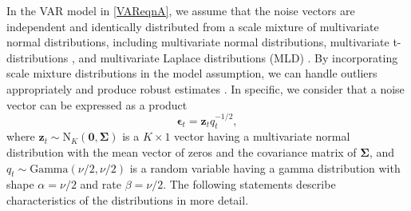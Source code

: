 \documentclass[
]{jss}
\begin{document}
In the VAR model in \eqref{VAReqnA}, we assume that the noise vectors
are independent and identically distributed from a scale mixture of
multivariate normal distributions, including multivariate normal
distributions, multivariate t-distributions \citep{Ni05}, and
multivariate Laplace distributions (MLD) \citep{Eltoft06}. By
incorporating scale mixture distributions in the model assumption, we
can handle outliers appropriately and produce robust estimates
\citep{West84}. In specific, we consider that a noise vector can be
expressed as a product \begin{equation}
    \label{productZD}
    \boldsymbol\epsilon_t = \mathbf{z}_t q_t^{-1/2},
    \end{equation} where
\(\mathbf{z}_t \sim \text{N}_K(\mathbf{0}, \mathbf{\Sigma})\) is a
\(K\times 1\) vector having a multivariate normal distribution with the
mean vector of zeros and the covariance matrix of \(\boldsymbol\Sigma\),
and \(q_t \sim \text{Gamma}(\nu/2, \nu/2)\) is a random variable having
a gamma distribution with shape \(\alpha = \nu/2\) and rate
\(\beta = \nu/2\). The following statements describe characteristics of
the distributions in more detail.
\end{document}
